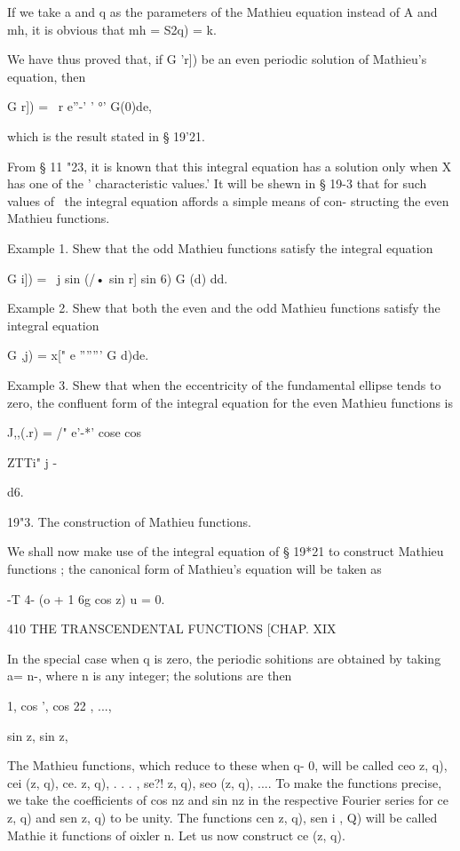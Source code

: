 If we take a and q as the parameters of the Mathieu equation instead of 
A and mh, it is obvious that mh = \/ S2q) = k. 

We have thus proved that, if G 'r]) be an even periodic solution of 
Mathieu's equation, then 

G r]) = \ r e''-'  ' °' G(0)de, 

which is the result stated in § 19'21. 

From § 11 "23, it is known that this integral equation has a solution only 
when X has one of the ' characteristic values.' It will be shewn in § 19-3 that 
for such values of \, the integral equation affords a simple means of con- 
structing the even Mathieu functions. 

Example 1. Shew that the odd Mathieu functions satisfy the integral equation 

G i]) = \ j sin (/• sin r] sin 6) G (d) dd. 

Example 2. Shew that both the even and the odd Mathieu functions satisfy the 
integral equation 

G ,j) = x[" e '''''''  G d)de. 

Example 3. Shew that when the eccentricity of the fundamental ellipse tends to zero, 
the confluent form of the integral equation for the even Mathieu functions is 



J,,(.r) =   /" e'-*' cose cos    

ZTTi" j -  



d6. 



19"3. The construction of Mathieu functions. 

We shall now make use of the integral equation of § 19*21 to construct 
Mathieu functions ; the canonical form of Mathieu's equation will be taken as 

-T  4- (o + 1 6g cos  z) u = 0. 



410 THE TRANSCENDENTAL FUNCTIONS [CHAP. XIX 

In the special case when q is zero, the periodic sohitions are obtained by 
taking a= n-, where n is any integer; the solutions are then 

1, cos ', cos 22 , ..., 

sin z, sin  z, 

The Mathieu functions, which reduce to these when q- 0, will be called 
ceo  z, q), cei (z, q), ce.  z, q), . . . , 
se?!  z, q), seo (z, q), .... 
To make the functions precise, we take the coefficients of cos nz and sin nz 
in the respective Fourier series for ce   z, q) and sen  z, q) to be unity. The 
functions cen z, q), sen i , Q) will be called Mathie it functions of oixler n. 
Let us now construct ce  (z, q). 

